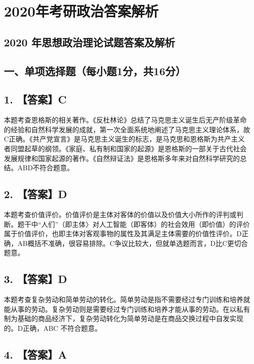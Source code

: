\documentclass[UTF8,11pt]{ctexart}
\begin{document}
\section*{2020年考研政治答案解析}
\subsection*{2020 年思想政治理论试题答案及解析}

\subsection*{一、单项选择题（每小题1分，共16分）}

\subsection*{1. 【答案】C}

本题考查恩格斯的相关著作。《反杜林论》总结了马克思主义诞生后无产阶级革命的经验和自然科学发展的成就，第一次全面系统地阐述了马克思主义理论体系，故C正确。《共产党宣言》是马克思主义诞生的标志，是马克思和恩格斯为共产主义者同盟起草的纲领。《家庭、私有制和国家的起源》是恩格斯的一部关于古代社会发展规律和国家起源的著作。《自然辩证法》是恩格斯多年来对自然科学研究的总结。ABD不符合题意。


\subsection*{2. 【答案】D}

本题考查价值评价。价值评价是主体对客体的价值以及价值大小所作的评判或判断。题干中“人们”（即主体〉对人工智能（即客体）的社会效用（即价值）的评价属于价值评价，也即主体对客观事物的属性及其满足主体需要的价值性评价。D正确，AB概括不准确，很容易排除。C争议比较大，但就单选题而言，D比C更切合题意。


\subsection*{3. 【答案】D}

本题考查复杂劳动和简单劳动的转化。简单劳动是指不需要经过专门训练和培养就能从事的劳动。复杂劳动则是需要经过专门训练和培养才能从事的劳动。在以私有制为基础的商品经济下，复杂劳动转化为简单劳动是在商品交换过程中自发实现的。D正确，ABC 不符合题意。


\subsection*{4. 【答案】A}
\end{document}
